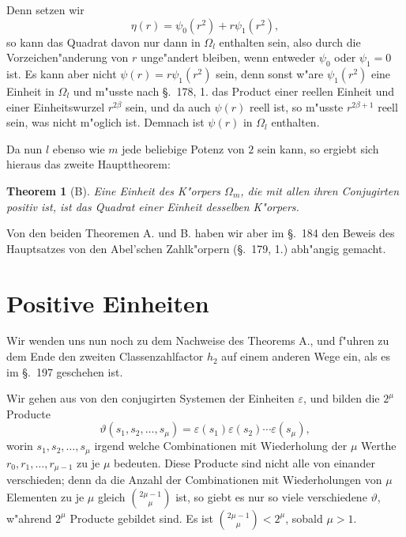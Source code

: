 \documentclass[10pt,a4paper]{article}
\theoremstyle{weberstyle}
\newtheorem{theorem}{Theorem}[section]
\begin{document}
Denn setzen wir
\[
\eta(r) = \psi_0(r^2) + r\psi_1(r^2),
\]
so kann das Quadrat davon nur dann in $\Omega_l$ enthalten sein, also durch
die Vorzeichen"anderung von $r$ unge"andert bleiben, wenn entweder
$\psi_0$ oder $\psi_1=0$ ist. Es kann aber nicht $\psi(r)=r\psi_1(r^2)$ sein,
denn sonst w"are $\psi_1(r^2)$ eine Einheit in $\Omega_l$ und m"usste nach
\S.~178, 1. das Product einer reellen Einheit und einer Einheitswurzel
$r^{2\beta}$ sein, und da auch $\psi(r)$ reell ist, so m"usste $r^{2\beta+1}$ reell
sein, was nicht m"oglich ist. Demnach ist $\psi(r)$ in $\Omega_l$ enthalten.

Da nun $l$ ebenso wie $m$ jede beliebige Potenz von $2$ sein kann, so ergiebt
sich hieraus das zweite Haupttheorem:

\begin{theorem}[B]
Eine Einheit des K"orpers $\Omega_m$, die mit allen ihren Conjugirten
positiv ist, ist das Quadrat einer Einheit desselben K"orpers.
\end{theorem}

Von den beiden Theoremen A. und B. haben wir aber im \S.~184 den Beweis
des Hauptsatzes von den Abel'schen Zahlk"orpern (\S.~179, 1.) abh"angig
gemacht.

\newpage

%
%
\section{Positive Einheiten}\label{sec:202}

Wir wenden uns nun noch zu dem Nachweise des Theorems A., und f"uhren zu
dem Ende den zweiten Classenzahlfactor $h_2$ auf einem anderen Wege ein,
als es im \S.~197 geschehen ist.

Wir gehen aus von den conjugirten Systemen der Einheiten $\varepsilon$, und
bilden die $2^\mu$ Producte
\begin{equation}\label{eq:202.1}
\vartheta(s_1,s_2,\dots,s_\mu)=\varepsilon(s_1)\varepsilon(s_2)\cdots\varepsilon(s_\mu),
\end{equation}
worin $s_1,s_2,\dots,s_\mu$ irgend welche Combinationen mit Wiederholung
der $\mu$ Werthe $r_0,r_1,\dots,r_{\mu-1}$ zu je $\mu$ bedeuten. Diese Producte
sind nicht alle von einander verschieden; denn da die Anzahl der
Combinationen mit Wiederholungen von $\mu$ Elementen zu je $\mu$ gleich
$\binom{2\mu-1}{\mu}$ ist, so giebt es nur so viele verschiedene
$\vartheta$, w"ahrend $2^\mu$ Producte gebildet sind. Es ist
$\binom{2\mu-1}{\mu}<2^\mu$, sobald $\mu>1$.
\end{document}
